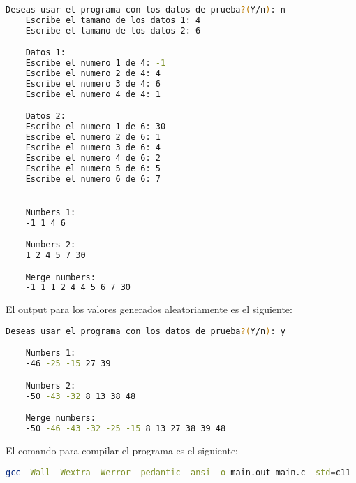 \begin{lstlisting}[language=bash]
    Deseas usar el programa con los datos de prueba?(Y/n): n
    Escribe el tamano de los datos 1: 4
    Escribe el tamano de los datos 2: 6

    Datos 1:
    Escribe el numero 1 de 4: -1
    Escribe el numero 2 de 4: 4
    Escribe el numero 3 de 4: 6
    Escribe el numero 4 de 4: 1

    Datos 2:
    Escribe el numero 1 de 6: 30
    Escribe el numero 2 de 6: 1
    Escribe el numero 3 de 6: 4
    Escribe el numero 4 de 6: 2
    Escribe el numero 5 de 6: 5
    Escribe el numero 6 de 6: 7


    Numbers 1:
    -1 1 4 6 

    Numbers 2:
    1 2 4 5 7 30 

    Merge numbers:
    -1 1 1 2 4 4 5 6 7 30 
\end{lstlisting}

El output para los valores generados aleatoriamente es el siguiente:

\begin{lstlisting}[language=bash]
    Deseas usar el programa con los datos de prueba?(Y/n): y

    Numbers 1:
    -46 -25 -15 27 39 

    Numbers 2:
    -50 -43 -32 8 13 38 48 

    Merge numbers:
    -50 -46 -43 -32 -25 -15 8 13 27 38 39 48 

\end{lstlisting}

El comando para compilar el programa es el siguiente:
\begin{lstlisting}[language=bash]
    gcc -Wall -Wextra -Werror -pedantic -ansi -o main.out main.c -std=c11
\end{lstlisting}